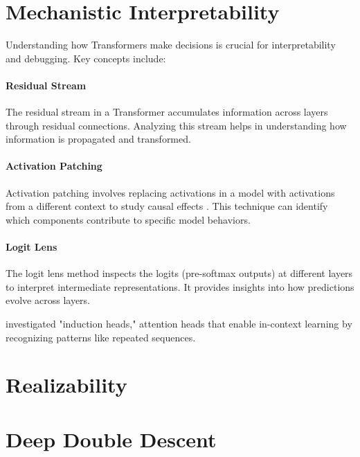 \section{Mechanistic Interpretability}\label{sec:mech_interp}


Understanding how Transformers make decisions is crucial for interpretability and debugging. Key concepts include:

\paragraph{Residual Stream}

The residual stream in a Transformer accumulates information across layers through residual connections. Analyzing this stream helps in understanding how information is propagated and transformed.

\paragraph{Activation Patching}

Activation patching involves replacing activations in a model with activations from a different context to study causal effects \parencite{olsson_-context_2022}. This technique can identify which components contribute to specific model behaviors.

\paragraph{Logit Lens}

The logit lens method inspects the logits (pre-softmax outputs) at different layers to interpret intermediate representations. It provides insights into how predictions evolve across layers.

\textcite{olsson_-context_2022} investigated "induction heads," attention heads that enable in-context learning by recognizing patterns like repeated sequences.

\section{Realizability}\label{sec:realizability}


\section{Deep Double Descent}\label{sec:deep_double_descent}

